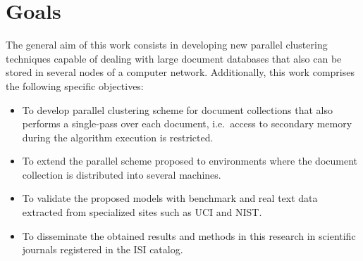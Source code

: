 \documentclass[10pt]{article}
\begin{document}
\section{Goals}
The general aim of this work consists in developing new parallel clustering techniques capable of dealing with large document databases that also can be stored in several nodes of a computer network.
Additionally, this work comprises the following specific objectives:
\begin{itemize}
\item To develop parallel clustering scheme for document collections that also performs a single-pass over each document, i.e.\  access to secondary memory during the algorithm execution is restricted.
\item To extend the parallel scheme proposed to environments where the document collection is distributed into several machines.
\item To validate the proposed models with benchmark and real text data extracted from specialized sites such as UCI and NIST.
\item To disseminate the obtained results and methods in this research in scientific journals registered in the ISI catalog.
\end{itemize}


\end{document}
